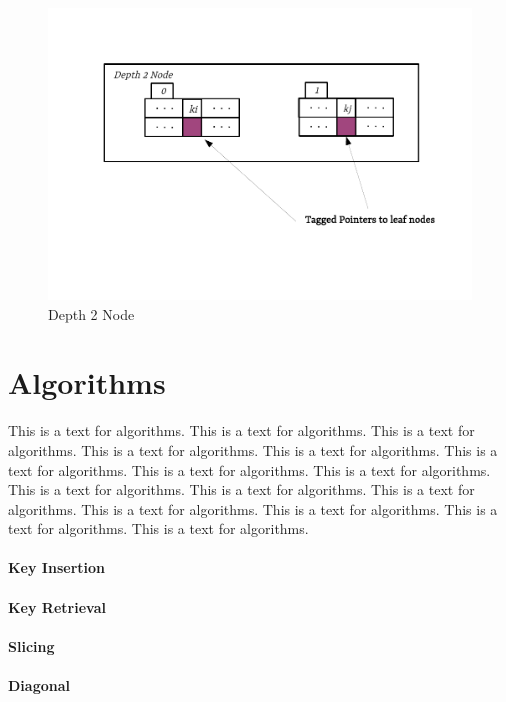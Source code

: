 \begin{figure}
	\centering
	\vspace{-1in}
	\includegraphics{figures/chapter4/depth2}
	\caption{Depth 2 Node}
	\label{fig:compressed_depth_2_node}
\end{figure}

\section{Algorithms}
This is a text for algorithms. 
This is a text for algorithms. This is a text for algorithms. This is a text for algorithms. This is a text for algorithms. This is a text for algorithms. This is a text for algorithms. This is a text for algorithms. This is a text for algorithms. This is a text for algorithms. This is a text for algorithms. This is a text for algorithms. 
This is a text for algorithms. This is a text for algorithms. This is a text for algorithms.

\paragraph{Key Insertion} 
\paragraph{Key Retrieval}
\paragraph{Slicing} 

\paragraph{Diagonal}

